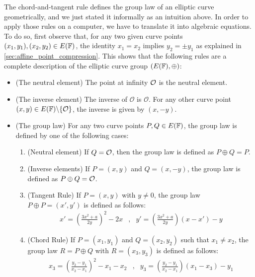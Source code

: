 The chord-and-tangent rule defines the group law of an elliptic curve geometrically, and we just stated it informally as an intuition above. In order to apply those rules on a computer, we have to translate it into algebraic equations. To do so, first observe that, for any two given curve points $(x_1,y_1), (x_2,y_2)\in E(\mathbb{F})$, the identity $x_1=x_2$ implies $y_2=\pm y_1$ as explained in \secname{} \ref{sec:affine_point_compression}. This shows that the following rules are a complete description of the elliptic curve group $(E(\mathbb{F}),\oplus)$:

\begin{definition}\label{def:chord-tangent-algebra}
\begin{itemize}
\item (The neutral element) The point at infinity $\mathcal{O}$ is the neutral element.
\item (The inverse element) The inverse of $\mathcal{O}$ is $\mathcal{O}$. For any other curve point $(x,y) \in E(\mathbb{F})\backslash \{\mathcal{O}\}$, the inverse is given by $(x,-y)$.
\item (The group law) For any two curve points $P, Q \in E(\mathbb{F})$, the group law is defined by one of the following cases:
\begin{enumerate}
\item (Neutral element) If $Q=\mathcal{O}$, then the group law is defined as $P\oplus Q=P$.
\item (Inverse elements)  If $P=(x,y)$ and $Q=(x,-y)$, the group law is defined as $P\oplus Q=\mathcal{O}$.
\item (Tangent Rule) If $P=(x,y)$ with $y\neq 0$, the group law $P\oplus P=(x',y')$ is defined as follows:
$$
\begin{array}{llr}
x' = \left(\frac{3x^2+a}{2y}\right)^2 -2x &,&
y' = \left(\frac{3x^2+a}{2y}\right)\left(x-x'\right) - y
\end{array} 
$$
\item (Chord Rule) If $P=(x_1,y_1)$ and $Q=(x_2,y_2)$ such that $x_1 \neq x_2$, the group law $R=P\oplus Q$ with $R=(x_3,y_3)$ is defined as follows:
$$
\begin{array}{llr}
x_3 = \left(\frac{y_2-y_1}{x_2-x_1}\right)^2 -x_1-x_2 &, &
y_3 = \left(\frac{y_2-y_1}{x_2-x_1} \right)\left(x_1-x_3\right) - y_1
\end{array} 
$$
\end{enumerate}
\end{itemize}
\end{definition}
